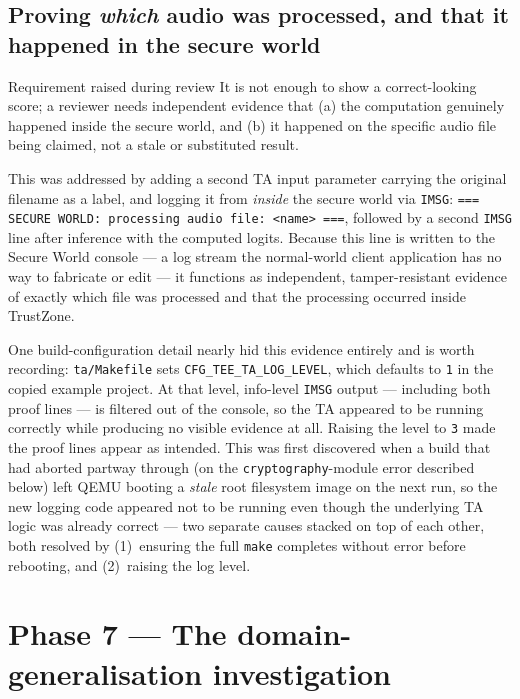 \documentclass[11pt,a4paper]{report}
\newcommand{\code}[1]{\texttt{\small #1}}
\begin{document}
\subsection{Proving \emph{which} audio was processed, and that it happened in the secure world}

\begin{decisionbox}{Requirement raised during review}
It is not enough to show a correct-looking score; a reviewer needs independent evidence that (a)
the computation genuinely happened inside the secure world, and (b) it happened on the specific
audio file being claimed, not a stale or substituted result.
\end{decisionbox}

This was addressed by adding a second TA input parameter carrying the original filename as a label,
and logging it from \emph{inside} the secure world via \code{IMSG}: \code{=== SECURE WORLD:
processing audio file: <name> ===}, followed by a second \code{IMSG} line after inference with the
computed logits. Because this line is written to the Secure World console --- a log stream the
normal-world client application has no way to fabricate or edit --- it functions as independent,
tamper-resistant evidence of exactly which file was processed and that the processing occurred
inside TrustZone.

One build-configuration detail nearly hid this evidence entirely and is worth recording:
\code{ta/Makefile} sets \code{CFG\_TEE\_TA\_LOG\_LEVEL}, which defaults to \code{1} in the copied
example project. At that level, info-level \code{IMSG} output --- including both proof lines --- is
filtered out of the console, so the TA appeared to be running correctly while producing no visible
evidence at all. Raising the level to \code{3} made the proof lines appear as intended. This was
first discovered when a build that had aborted partway through (on the \code{cryptography}-module
error described below) left QEMU booting a \emph{stale} root filesystem image on the next run, so
the new logging code appeared not to be running even though the underlying TA logic was already
correct --- two separate causes stacked on top of each other, both resolved by (1)~ensuring the
full \code{make} completes without error before rebooting, and (2)~raising the log level.

\section{Phase 7 --- The domain-generalisation investigation}
\label{sec:ood}
\end{document}
